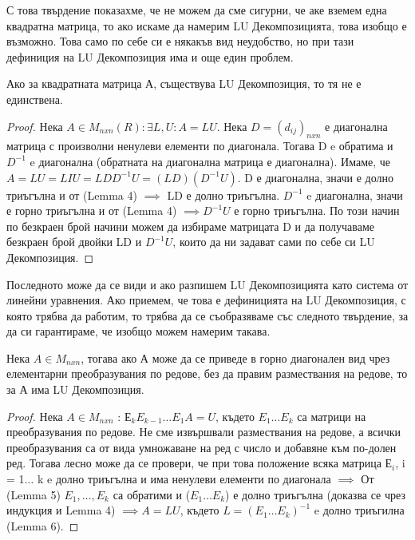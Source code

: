 \documentclass{article}
\begin{document}
С това твърдение показахме, че не можем да сме сигурни, че аке вземем една квадратна матрица, то ако искаме да намерим LU Декомпозицията, това изобщо е възможно. Това само по себе си е някакъв вид неудобство, но при тази дефиниция на LU Декомпозиция има и още един проблем.
\begin{theorem}
Ако за квадратната матрица А, съществува LU Декомпозиция, то тя не е единствена.
\end{theorem}
\begin{proof}
Нека $A \in M_{nxn}(R) : \exists L, U : A = LU$. Нека $D = (d_{ij})_{nxn}$ е диагонална матрица с произволни ненулеви елементи по диагонала. Тогава D e обратима и $D^{-1}$ e диагонална (обратната на диагонална матрица е диагонална). Имаме, че $A = LU = LIU = LDD^{-1}U = (LD)(D^{-1}U)$. D е диагонална, значи е долно триъгълна и от (Lemma 4) $\implies$ LD е долно триъгълна.  $D^{-1}$ e диагонална, значи е горно триъгълна и от (Lemma 4) $\implies D^{-1}U$ е горно триъгълна. По този начин по безкраен брой начини можем да избираме матрицата D и да получаваме безкраен брой двойки LD и $D^{-1}U$, които да ни задават сами по себе си LU Декомпозиция.  
\end{proof}

Последното може да се види и ако разпишем LU Декомпозицията като система от линейни уравнения. Ако приемем, че това е дефиницията на LU Декомпозиция, с която трябва да работим, то трябва да се съобразяваме със следното твърдение, за да си гарантираме, че изобщо можем намерим такава.
\begin{theorem}
Нека $A\in M_{nxn}$, тогава ако А може да се приведе в горно диагонален вид чрез елементарни преобразувания по редове, без да правим размествания на редове, то за А има LU Декомпозиция. 
\end{theorem}
\begin{proof}
Нека $A \in M_{nxn}$ : Е$_{k}E_{k-1}\dots E_{1}A = U$, където $E_{1}\dots E_{k}$ са матрици на преобразувания по редове. Не сме извършвали размествания на редове, а всички преобразувания са от вида умножаване на ред с число и добавяне към по-долен ред. Тогава лесно може да се провери, че при това положение всяка матрица Е$_{i}$, i = {1$\dots$ k} e долно триъгълна и има ненулеви елементи по диагонала $\implies$ От (Lemma 5)  $E_{1}, \dots , E_{k}$ са обратими и ($E_{1}\dots E_{k}$) е долно триъгълна (доказва се чрез индукция и Lemma 4) $\implies A = LU$, където $L = (E_{1}\dots E_{k})^{-1}$ e долно триъгилна (Lemma 6).
\end{proof}
\end{document}
